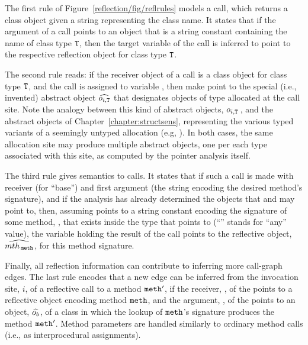 The first rule of Figure~\ref{reflection/fig/reflrules} models a
 call, which returns a class object given a string
representing the class name. It states that if the argument of a
 call points to an object that is a string constant
containing the name of class type \(\texttt{T}\), then the target variable
of the  call is inferred to point to the respective
reflection object for class type \(\texttt{T}\).

The second rule reads: if the receiver object of a 
call is a class object for class type \(\texttt{T}\), and the
 call is assigned to variable , then make
 point to the special (i.e., invented) abstract object
\(\widehat{o_{i,\texttt{T}}}\) that designates objects of type 
allocated at the  call site. Note the analogy
between this kind of abstract objects, \(o_{i,\texttt{T}}\,\), and the
abstract objects of Chapter~\ref{chapter:structsens}, representing the
various typed variants of a seemingly untyped allocation (e.g,
). In both cases, the same allocation site may produce
multiple abstract objects, one per each type associated with this
site, as computed by the pointer analysis itself.

The third rule gives semantics to  calls.  It states
that if such a call is made with receiver  (for ``base'') and
first argument  (the string encoding the desired method's
signature), and if the analysis has already determined the objects
that  and  may point to, then, assuming  points
to a string constant encoding the signature of some method,
, that exists inside the type that  points to
(``\var{\_}'' stands for ``any'' value), the variable  holding
the result of the  call points to the reflective
object, \(\widehat{mth_{\,\texttt{meth}}}\), for this method signature.

Finally, all reflection information can contribute to inferring more
call-graph edges. The last rule encodes that a new edge can be
inferred from the invocation site, \(i\), of a reflective
 call to a method \(\texttt{meth}'\), if the receiver,
, of the  points to a reflective object encoding
method \(\texttt{meth}\), and the argument, , of the
 points to an object, \(\widehat{o_b}\), of a class in
which the lookup of \(\texttt{meth}\)'s signature produces the method
\(\texttt{meth}'\). Method parameters are handled similarly to ordinary
method calls (i.e., as interprocedural assignments).

